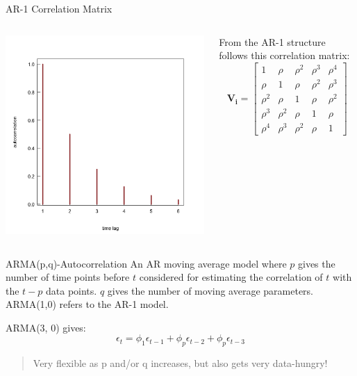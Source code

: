 \documentclass{beamer}
\begin{document}
\begin{frame}{AR-1 Correlation Matrix}
\begin{columns}
    \begin{column}{0.5\textwidth}
        \includegraphics[width=\textwidth]{lectures/day_4_GLS/figures/unnamed-chunk-14-1.png}
    \end{column}
    \begin{column}{0.5\textwidth}
    From the AR-1 structure follows this correlation matrix:
    \[
    \mathbf{V_i} = 
    \begin{bmatrix}
    1 & \rho & \rho^2 & \rho^3 & \rho^4 \\
    \rho & 1 & \rho & \rho^2 & \rho^3 \\
    \rho^2 & \rho & 1 & \rho & \rho^2 \\
    \rho^3 & \rho^2 & \rho & 1 & \rho \\
    \rho^4 & \rho^3 & \rho^2 & \rho & 1
    \end{bmatrix}
    \]    
    \end{column}
\end{columns}

  
\end{frame}

\begin{frame}{ARMA(p,q)-Autocorrelation}
  An AR moving average model where $p$ gives the number of time points before $t$ considered for estimating the correlation of $t$ with the $t - p$ data points. $q$ gives the number of moving average parameters. ARMA(1,0) refers to the AR-1 model.
  
  ARMA(3, 0) gives:
  \[
  \epsilon_t = \phi_1\epsilon_{t-1} + \phi_p\epsilon_{t-2} + \phi_p\epsilon_{t-3}
  \]
  \begin{quote}
    Very flexible as p and/or q increases, but also gets very data-hungry!
  \end{quote}
\end{frame}
\end{document}
